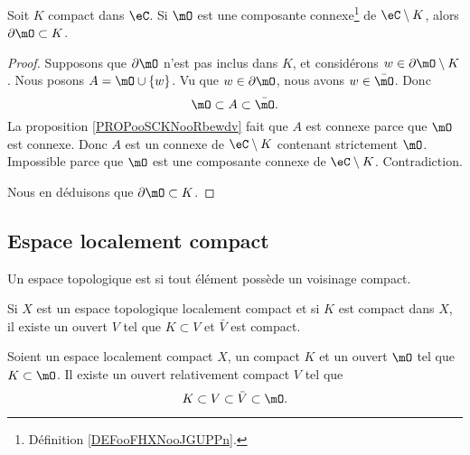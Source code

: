 \begin{proposition}       \label{PROPooOXKSooEDzCRZ}
	Soit \( K\) compact dans \( \eC\). Si \( \mO\) est une composante connexe\footnote{Définition \ref{DEFooFHXNooJGUPPn}.} de \( \eC\setminus K\), alors \( \partial \mO\subset K\).
\end{proposition}

\begin{proof}
	Supposons que \( \partial\mO\) n'est pas inclus dans \( K\), et considérons \( w\in\partial\mO\setminus K\). Nous posons \( A=\mO\cup\{ w \}\). Vu que \( w\in\partial\mO\), nous avons \( w\in\bar\mO\). Donc
	\begin{equation}
		\mO\subset A\subset\bar\mO.
	\end{equation}
	La proposition \ref{PROPooSCKNooRbewdv} fait que \( A\) est connexe parce que \( \mO\) est connexe. Donc \( A\) est un connexe de \( \eC\setminus K\) contenant strictement \( \mO\). Impossible parce que \( \mO\) est une composante connexe de \( \eC\setminus K\). Contradiction.

	Nous en déduisons que \( \partial\mO\subset K\).
\end{proof}

\subsection{Espace localement compact}

\begin{definition}  \label{DefEIBYooAWoESf}
	Un espace topologique est  si tout élément possède un voisinage compact.
\end{definition}

\begin{lemma}       \label{LEMooAXESooYvyesg}
	Si \( X\) est un espace topologique localement compact et si \( K\) est compact dans \( X\), il existe un ouvert \( V\) tel que \( K\subset V\) et \( \bar V\) est compact.
\end{lemma}

\begin{lemma}       \label{LEMooKYMKooPxZjWN}
	Soient un espace localement compact \( X\), un compact \( K\) et un ouvert \( \mO\) tel que \( K\subset \mO\). Il existe un ouvert relativement compact \( V\) tel que
	\begin{equation}
		K\subset V\subset \bar V\subset \mO.
	\end{equation}
\end{lemma}

